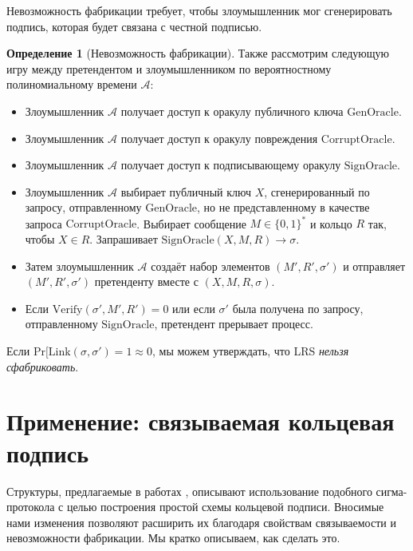 \documentclass{article}
\newcommand{\A}{\mathcal{A}}
\theoremstyle{definition}
\newtheorem{definition}{Определение}
\begin{document}
Невозможность фабрикации требует, чтобы злоумышленник мог сгенерировать подпись, которая будет связана с честной подписью.
\begin{definition}[Невозможность фабрикации]
Также рассмотрим следующую игру между претендентом и злоумышленником по вероятностному полиномиальному времени $\A$:
\begin{itemize}
\item Злоумышленник $\A$ получает доступ к оракулу публичного ключа $\text{GenOracle}$.
\item Злоумышленник $\A$ получает доступ к оракулу повреждения $\text{CorruptOracle}$.
\item Злоумышленник $\A$ получает доступ к подписывающему оракулу $\text{SignOracle}$.
\item Злоумышленник $\A$ выбирает публичный ключ $X$, сгенерированный по запросу, отправленному $\text{GenOracle}$, но не представленному в качестве запроса $\text{CorruptOracle}$.
Выбирает сообщение $M \in \{0,1\}^*$ и кольцо $R$ так, чтобы $X \in R$.
Запрашивает $\text{SignOracle}(X,M,R) \to \sigma$.
\item Затем злоумышленник $\A$ создаёт набор элементов $(M',R',\sigma')$ и отправляет $(M',R',\sigma')$ претенденту вместе с $(X,M,R,\sigma)$.
\item Если $\text{Verify}(\sigma',M',R') = 0$ или если $\sigma'$ была получена по запросу, отправленному $\text{SignOracle}$, претендент прерывает процесс.
\end{itemize}
Если $\text{Pr}[ \text{Link}(\sigma,\sigma') = 1 \approx 0$, мы можем утверждать, что LRS \textit{нельзя сфабриковать}.
\end{definition}


\section{Применение: связываемая кольцевая подпись}
Структуры, предлагаемые в работах \cite{groth,bootle}, описывают использование подобного сигма-протокола с целью построения простой схемы кольцевой подписи.
Вносимые нами изменения позволяют расширить их благодаря свойствам связываемости и невозможности фабрикации. Мы кратко описываем, как сделать это.
\end{document}
